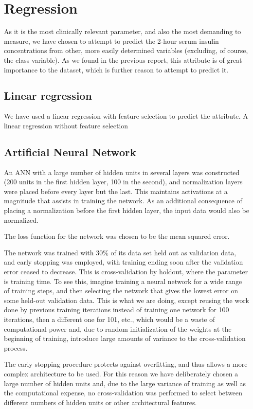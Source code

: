 \section{Regression}
As it is the most clinically relevant parameter,
and also the most demanding to measure,
we have chosen to attempt to predict the 2-hour serum insulin concentrations
from other, more easily determined variables
(excluding, of course, the class variable).
As we found in the previous report,
this attribute is of great importance to the dataset,
which is further reason to attempt to predict it.

\subsection{Linear regression}
We have used a linear regression with feature selection to predict the attribute.
A linear regression without feature selection 

\subsection{Artificial Neural Network}
An ANN with a large number of hidden units in several layers was constructed
(200 units in the first hidden layer, 100 in the second),
and normalization layers were placed before every layer but the last.
This maintains activations at a magnitude that assists in training the network.
As an additional consequence of placing a normalization before the first hidden layer,
the input data would also be normalized.

The loss function for the network was chosen to be the mean squared error.

The network was trained with 30\% of its data set held out as validation data,
and early stopping was employed, with training ending soon after the validation error
ceased to decrease.
This is cross-validation by holdout,
where the parameter is training time.
To see this,
imagine training a neural network for a wide range of training steps,
and then selecting the network that gives the lowest error
on some held-out validation data.
This is what we are doing,
except reusing the work done by previous training iterations
instead of training one network for 100 iterations,
then a different one for 101, etc.,
which would be a waste of computational power
and, due to random initialization of the weights at the beginning of training,
introduce large amounts of variance to the cross-validation process.

The early stopping procedure protects against overfitting,
and thus allows a more complex architecture to be used.
For this reason we have deliberately chosen a large number of hidden units
and, due to the large variance of training as well as the computational expense,
no cross-validation was performed to select between different numbers of hidden units
or other architectural features.

